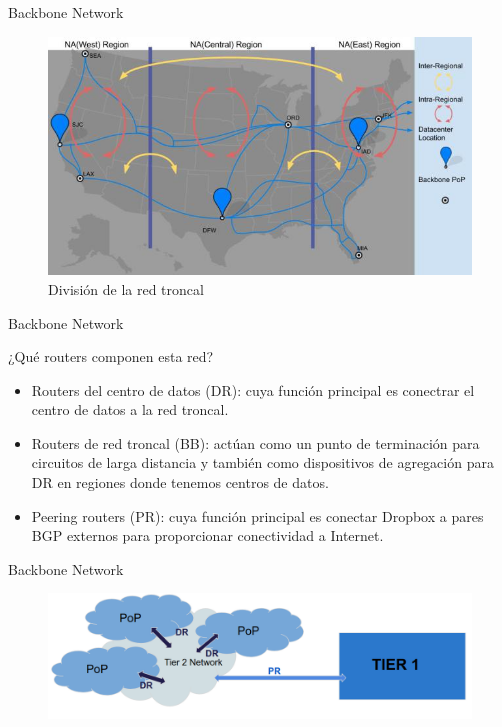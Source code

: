 \documentclass[10pt]{beamer}
\begin{document}
\begin{frame}{Backbone Network}
\begin{figure}[h]
  \centering
  \includegraphics[width=1\linewidth]{bb2}
\caption{División de la red troncal}
\end{figure}
\end{frame}

\begin{frame}{Backbone Network}
\begin{alertblock}{¿Qué routers componen esta red?}
\begin{itemize}
\item Routers del centro de datos (DR): cuya función principal es conectrar el centro de datos a la red troncal.
\item Routers de red troncal (BB): actúan como un punto de terminación para circuitos de larga distancia y también como dispositivos de agregación para DR en regiones donde tenemos centros de datos.
\item Peering routers (PR): cuya función principal es conectar Dropbox a pares BGP externos para proporcionar conectividad a Internet.
\end{itemize}
\end{alertblock}
\end{frame}

\begin{frame}{Backbone Network}
\begin{figure}[h]
  \centering
  \includegraphics[width=1\linewidth]{bb3}
\end{figure}
\end{frame}
\end{document}
